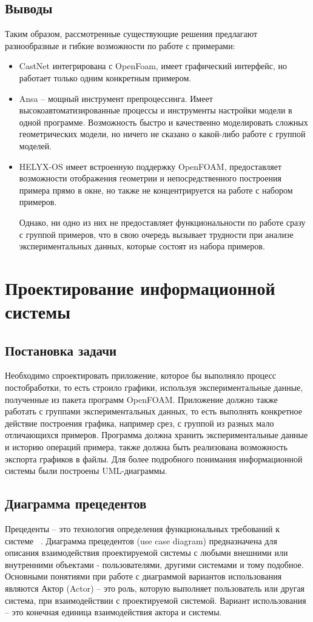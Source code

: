 \documentclass[14pt]{extreport}
\begin{document}
\section{Выводы}

Таким образом, рассмотренные существующие решения предлагают разнообразные и гибкие возможности по работе с примерами:
\begin{itemize}
\item CastNet интегрирована с OpenFoam, имеет графический интерфейс, но работает только одним конкретным примером. \item Ansa -- мощный инструмент препроцессинга. Имеет высокоавтоматизированные процессы и инструменты настройки модели в одной программе. Возможность быстро и качественно моделировать сложных геометрических модели, но ничего не сказано о какой-либо работе с группой моделей. 
\item HELYX-OS имеет встроенную поддержку OpenFOAM, предоставляет возможности отображения геометрии и непосредственного построения примера прямо в окне, но также не концентрируется на работе с набором примеров. 

Однако, ни одно из них не предоставляет функциональности по работе сразу с группой примеров, что в свою очередь вызывает трудности при анализе экспериментальных данных, которые состоят из набора примеров.  
\end{itemize}

\chapter{Проектирование информационной системы}
\section{Постановка задачи}
Необходимо спроектировать приложение, которое бы выполняло процесс постобработки, то есть строило графики, используя экспериментальные данные, полученные из пакета программ OpenFOAM. Приложение должно также работать с группами экспериментальных данных, то есть выполнять конкретное действие построения графика, например срез, с группой из разных мало отличающихся примеров. Программа должна хранить экспериментальные данные и историю операций примера, также должна быть реализована возможность экспорта графиков в файлы.
Для более подробного понимания информационной системы были построены UML-диаграммы. 

\section{Диаграмма прецедентов}
Прецеденты -- это технология определения функциональных требований к системе ~\cite{umlDistilled}. 
Диаграмма прецедентов (use case diagram) предназначена для описания взаимодействия проектируемой системы с любыми внешними или внутренними объектами - пользователями, другими системами и тому подобное.
Основными понятиями при работе с диаграммой вариантов использования являются 
Актор (Actor) -- это роль, которую выполняет пользователь или другая система, при взаимодействии с проектируемой системой.
Вариант использования -- это конечная единица взаимодействия актора и системы. 
\end{document}
